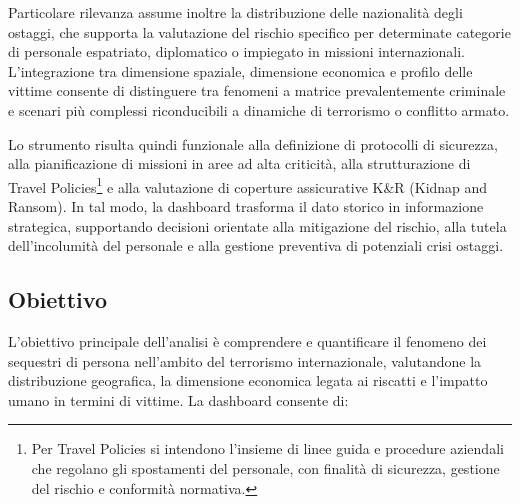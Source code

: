 Particolare rilevanza assume inoltre la distribuzione delle nazionalità degli ostaggi, che supporta la valutazione del rischio specifico per determinate categorie di personale espatriato, diplomatico o impiegato in missioni internazionali. L’integrazione tra dimensione spaziale, dimensione economica e profilo delle vittime consente di distinguere tra fenomeni a matrice prevalentemente criminale e scenari più complessi riconducibili a dinamiche di terrorismo o conflitto armato.

Lo strumento risulta quindi funzionale alla definizione di protocolli di sicurezza, alla pianificazione di missioni in aree ad alta criticità, alla strutturazione di Travel Policies\footnote{Per {Travel Policies} si intendono l’insieme di linee guida e procedure aziendali che regolano gli spostamenti del personale, con finalità di sicurezza, gestione del rischio e conformità normativa.}
 e alla valutazione di coperture assicurative K\&R (Kidnap and Ransom). In tal modo, la dashboard trasforma il dato storico in informazione strategica, supportando decisioni orientate alla mitigazione del rischio, alla tutela dell’incolumità del personale e alla gestione preventiva di potenziali crisi ostaggi.

\subsection{Obiettivo}

L’obiettivo principale dell’analisi è comprendere e quantificare il fenomeno dei sequestri
di persona nell’ambito del terrorismo internazionale, valutandone la distribuzione geografica,
la dimensione economica legata ai riscatti e l’impatto umano in termini di vittime.
La dashboard consente di:


